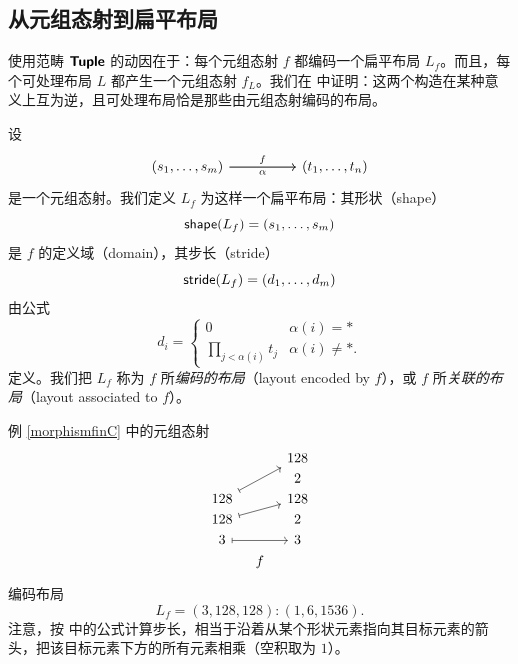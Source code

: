 \subsection{从元组态射到扁平布局}

\noindent 使用范畴 ${\boldsymbol{\mathsf{Tuple}}}$ 的动因在于：每个元组态射 $f$ 都编码一个扁平布局 $L_f$。而且，每个可处理布局 $L$ 都产生一个元组态射 $f_L$。我们在  中证明：这两个构造在某种意义上互为逆，且可处理布局恰是那些由元组态射编码的布局。

\begin{construction} \label{layoutfrommorphisminTuple}
设
\[\begin{tikzcd} (s_1,\dots,s_m) \ar[rr,"f"] \ar[rr,swap,"\alpha"] & &  (t_1,\dots,t_n)\end{tikzcd} \]
是一个元组态射。我们定义 $L_f$ 为这样一个扁平布局：其形状（shape）
\[\mathsf{shape}(L_f) = (s_1,\dots,s_m)\]
是 $f$ 的定义域（domain），其步长（stride）
\[\mathsf{stride}(L_f) = (d_1,\dots,d_m)\] 由公式
\[d_i = \begin{cases}
0 & \alpha(i) = * \\
\prod_{j < \alpha(i)} t_j & \alpha(i) \neq *.
\end{cases}
\]
定义。我们把 $L_f$ 称为 $f$ 所{\it 编码的布局}（layout encoded by $f$），或 $f$ 所\emph{关联的布局}（layout associated to $f$）。
\end{construction}




\begin{example} 例 \ref{morphismfinC} 中的元组态射
\[
\begin{tikzcd}[row sep = 1, column sep = 8]
 & & 128  \\
 & & 2   \\
 128 \ar[rruu, mapsto] & & 128  \\
 128  \ar[rru,mapsto] & & 2  \\
 3 \ar[rr,mapsto] & & 3  \\
 & f &  \\
\end{tikzcd}
\]
编码布局
\[
L_f  = (3,128,128) : (1,6,1536).
\]
注意，按  中的公式计算步长，相当于沿着从某个形状元素指向其目标元素的箭头，把该目标元素下方的所有元素相乘（空积取为 $1$）。
\end{example}

